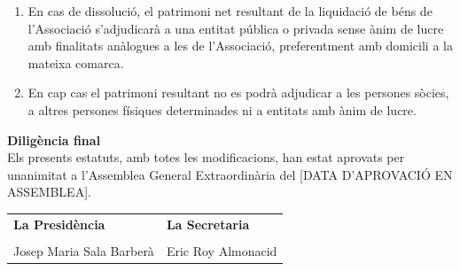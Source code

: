 \documentclass[11pt,a4paper]{article}
\newcommand{\dataaprov}{[DATA D'APROVACIÓ EN ASSEMBLEA]}
\newcommand{\AGE}{Assemblea General Extraordinària\xspace}
\begin{document}

\begin{enumerate}
    \item En cas de dissolució, el patrimoni net resultant de la liquidació de béns de l'Associació s'adjudicarà a una entitat pública o privada sense ànim de lucre amb finalitats anàlogues a les de l'Associació, preferentment amb domicili a la mateixa comarca.
    \item En cap cas el patrimoni resultant no es podrà adjudicar a les persones sòcies, a altres persones físiques determinades ni a entitats amb ànim de lucre.
\end{enumerate}


\vspace{1.2cm}
\noindent\textcolor{TextGray}{\textbf{Diligència final}}\\[0.2cm]
\noindent Els presents estatuts, amb totes les modificacions, han estat aprovats per unanimitat a l'\AGE del \dataaprov.\\[0.6cm]
\noindent\begin{tabular}{p{} p{}}
\textbf{La Presidència} & \textbf{La Secretaria}\\[2.8cm]
\hrulefill & \hrulefill\\
Josep Maria Sala Barberà & Eric Roy Almonacid\\
\end{tabular}
\end{document}
